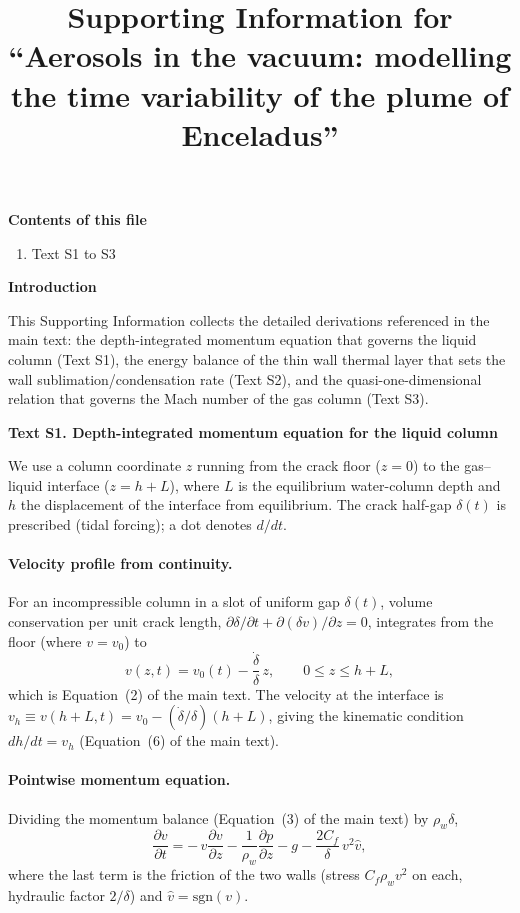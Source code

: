 \documentclass[draft,jgrga]{agutexSI2019}
\begin{document}
\title{Supporting Information for ``Aerosols in the vacuum: modelling the time variability of the plume of Enceladus''}


\begin{article}

\noindent\textbf{Contents of this file}
\begin{enumerate}
\item Text S1 to S3
\end{enumerate}

\noindent\textbf{Introduction}

This Supporting Information collects the detailed derivations referenced in the
main text: the depth-integrated momentum equation that governs the liquid column
(Text S1), the energy balance of the thin wall thermal layer that sets the
wall sublimation/condensation rate (Text S2), and the quasi-one-dimensional
relation that governs the Mach number of the gas column (Text S3).

\noindent\textbf{Text S1. Depth-integrated momentum equation for the liquid column}

We use a column coordinate $z$ running from the crack floor ($z=0$) to the
gas--liquid interface ($z=h+L$), where $L$ is the equilibrium water-column depth
and $h$ the displacement of the interface from equilibrium. The crack half-gap
$\delta(t)$ is prescribed (tidal forcing); a dot denotes $d/dt$.

\paragraph{Velocity profile from continuity.}
For an incompressible column in a slot of uniform gap $\delta(t)$, volume
conservation per unit crack length, $\partial\delta/\partial t +
\partial(\delta v)/\partial z = 0$, integrates from the floor (where $v=v_0$) to
\begin{equation}
    v(z,t) = v_0(t) - \frac{\dot\delta}{\delta}\,z,
    \qquad 0 \le z \le h+L,
    \label{eq:si-vel}
\end{equation}
which is Equation~(2) of the main text. The velocity at the interface is
$v_h \equiv v(h+L,t) = v_0 - (\dot\delta/\delta)(h+L)$, giving the kinematic
condition $dh/dt = v_h$ (Equation~(6) of the main text).

\paragraph{Pointwise momentum equation.}
Dividing the momentum balance (Equation~(3) of the main text) by $\rho_w\delta$,
\begin{equation}
    \frac{\partial v}{\partial t}
    = -\,v\frac{\partial v}{\partial z}
      - \frac{1}{\rho_w}\frac{\partial p}{\partial z}
      - g
      - \frac{2 C_f}{\delta}\,v^2\hat v,
    \label{eq:si-mom}
\end{equation}
where the last term is the friction of the two walls (stress $C_f\rho_w v^2$ on
each, hydraulic factor $2/\delta$) and $\hat v=\mathrm{sgn}(v)$.


\end{article}
\end{document}
